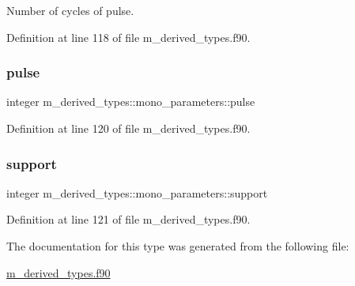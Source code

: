 Number of cycles of pulse. 



Definition at line 118 of file m\+\_\+derived\+\_\+types.\+f90.

\mbox{\label{structm__derived__types_1_1mono__parameters_a793ae086b0e3e92cbc558195186974fe}} 
\subsubsection{\texorpdfstring{pulse}{pulse}}
{\footnotesize\ttfamily integer m\+\_\+derived\+\_\+types\+::mono\+\_\+parameters\+::pulse}



Definition at line 120 of file m\+\_\+derived\+\_\+types.\+f90.

\mbox{\label{structm__derived__types_1_1mono__parameters_af11bb5d1fd721a4e7255b0926d62b249}} 
\subsubsection{\texorpdfstring{support}{support}}
{\footnotesize\ttfamily integer m\+\_\+derived\+\_\+types\+::mono\+\_\+parameters\+::support}



Definition at line 121 of file m\+\_\+derived\+\_\+types.\+f90.



The documentation for this type was generated from the following file\+:\begin{DoxyCompactItemize}
\item 
\hyperlink{m__derived__types_8f90}{m\+\_\+derived\+\_\+types.\+f90}\end{DoxyCompactItemize}
